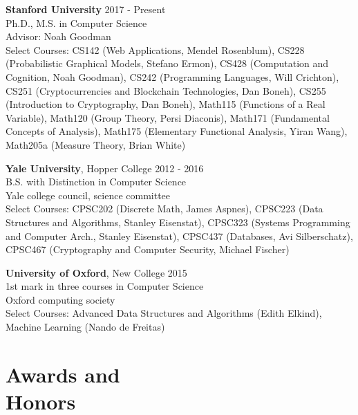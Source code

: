\documentclass[margin, 10pt]{res} %
\begin{document}
\begin{resume}
\textbf{Stanford University} \hfill 2017 - Present \\
Ph.D., M.S. in Computer Science \\
Advisor: Noah Goodman \\
Select Courses: CS142 (Web Applications, Mendel Rosenblum), CS228 (Probabilistic Graphical Models, Stefano Ermon), CS428 (Computation and Cognition, Noah Goodman), CS242 (Programming Languages, Will Crichton), CS251 (Cryptocurrencies and Blockchain Technologies, Dan Boneh), CS255 (Introduction to Cryptography, Dan Boneh), Math115 (Functions of a Real Variable), Math120 (Group Theory, Persi Diaconis), Math171 (Fundamental Concepts of Analysis), Math175 (Elementary Functional Analysis, Yiran Wang), Math205a (Measure Theory, Brian White)

\textbf{Yale University}, Hopper College \hfill 2012 - 2016 \\
B.S. with Distinction in Computer Science \\
Yale college council, science committee \\
Select Courses: CPSC202 (Discrete Math,  James Aspnes), CPSC223 (Data Structures and Algorithms, Stanley Eisenstat), CPSC323 (Systems Programming and Computer Arch., Stanley Eisenstat), CPSC437 (Databases, Avi Silberschatz), CPSC467 (Cryptography and Computer Security, Michael Fischer)

\textbf{University of Oxford}, New College \hfill 2015 \\
1st mark in three courses in Computer Science\\
Oxford computing society \\
Select Courses: Advanced Data Structures and Algorithms (Edith Elkind), Machine Learning (Nando de Freitas)


\section{Awards and \\ Honors}


\end{resume}
\end{document}
